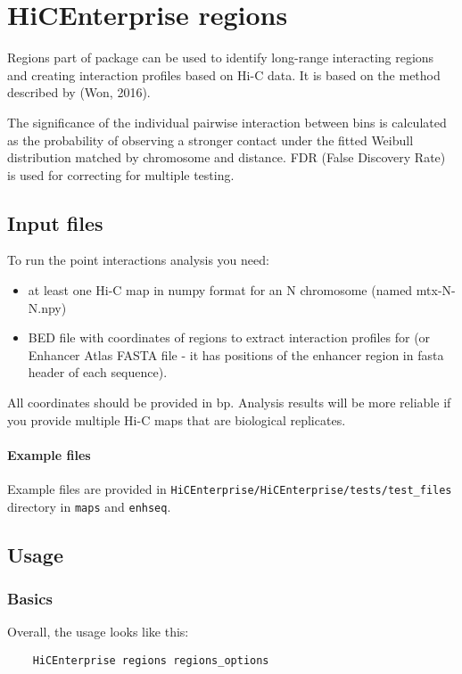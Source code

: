 \chapter{HiCEnterprise regions}
\label{regions}

Regions part of package can be used to identify long-range interacting regions and creating interaction profiles based
on Hi-C data. It is based on the method described by (Won, 2016).

The significance of the individual pairwise interaction between bins is calculated as the probability of observing a
stronger contact under the fitted Weibull distribution matched by chromosome and distance. FDR (False Discovery Rate) is
used for correcting for multiple testing.

\section{Input files}
\label{sec:input}

To run the point interactions analysis you need:
\begin{itemize}
    \item at least one Hi-C map in numpy format for an N chromosome (named mtx-N-N.npy)
    \item BED file with coordinates of regions to extract interaction profiles for (or Enhancer Atlas FASTA file - it has positions of the enhancer region in fasta header of each sequence).
\end{itemize}

All coordinates should be provided in bp. Analysis results will be more reliable if you provide multiple Hi-C maps that
are biological replicates.

\subsubsection{Example files}
Example files are provided in \lstinline{HiCEnterprise/HiCEnterprise/tests/test_files} directory in \lstinline{maps} and \lstinline{enhseq}.

\section{Usage}

\subsection{Basics}
Overall, the usage looks like this:
\begin{lstlisting} 
    HiCEnterprise regions regions_options
\end{lstlisting}

